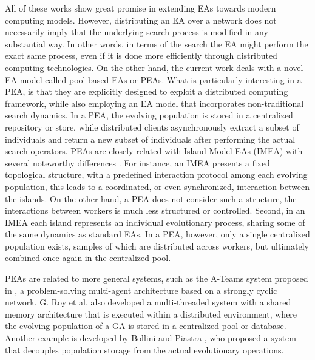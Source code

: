 All of these works show great promise in extending EAs towards modern computing models.
However, distributing an EA over a network does not necessarily imply that the underlying search process is modified in any substantial way.
In other words, in terms of the search the EA might perform the exact same process, even if it is done more efficiently through distributed computing technologies.
On the other hand, the current work deals with a novel EA model called pool-based EAs or PEAs.
What is particularly interesting in a PEA, is that they are explicitly designed to exploit a distributed computing framework, while also employing
an EA model that incorporates non-traditional search dynamics.
In a PEA, the evolving population is stored in a centralized repository or store, while distributed clients asynchronously extract a subset
of individuals and return a new subset of individuals after performing the actual search operators.
PEAs are closely related with Island-Model EAs (IMEA) \cite{cantu} with several noteworthy differences \cite{merelo:island}.
For instance, an IMEA presents a fixed topological structure, with a predefined interaction protocol among each evolving population,
this leads to a coordinated, or even synchronized, interaction between the islands.
On the other hand, a PEA does not consider such a structure, the interactions between workers is much less structured or controlled.
Second, in an IMEA each island represents an individual evolutionary process, sharing some of the same dynamics as standard EAs.
In a PEA, however, only a single centralized population exists, samples of which are distributed across workers, but ultimately combined once again
in the centralized pool.

PEAs are related to more general systems, such as the A-Teams system proposed in \cite{ateam}, a problem-solving multi-agent architecture based on a strongly cyclic network.
G. Roy et al. \cite{roy:2009} also developed a multi-threaded system with a shared memory architecture that is executed within a distributed environment,
where the evolving population of a GA is stored in a centralized pool or database.
Another example is developed by Bollini and Piastra \cite{bollini:1999}, who proposed a system that decouples population storage from the actual evolutionary operations.

